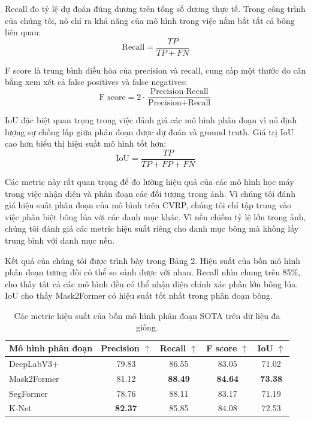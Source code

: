 \documentclass[12pt, a4paper]{article}
\begin{document}
Recall đo tỷ lệ dự đoán đúng dương trên tổng số dương thực tế. Trong công trình của chúng
tôi, nó chỉ ra khả năng của mô hình trong việc nắm bắt tất cả bông liên quan:
\begin{equation}
  \text{Recall} = \frac{TP}{TP + FN}
\end{equation}

F score là trung bình điều hòa của precision và recall, cung cấp một thước đo cân bằng xem
xét cả false positives và false negatives:
\begin{equation}
  \text{F score} = 2 \cdot \frac{\text{Precision} \cdot \text{Recall}}{\text{Precision} + \text{Recall}}
\end{equation}

IoU đặc biệt quan trọng trong việc đánh giá các mô hình phân đoạn vì nó định lượng sự chồng
lấp giữa phân đoạn được dự đoán và ground truth. Giá trị IoU cao hơn biểu thị hiệu suất mô
hình tốt hơn:
\begin{equation}
  \text{IoU} = \frac{TP}{TP + FP + FN}
\end{equation}

Các metric này rất quan trọng để đo lường hiệu quả của các mô hình học máy trong việc nhận
diện và phân đoạn các đối tượng trong ảnh. Vì chúng tôi đánh giá hiệu suất phân đoạn của mô
hình trên CVRP, chúng tôi chỉ tập trung vào việc phân biệt bông lúa với các danh mục khác.
Vì nền chiếm tỷ lệ lớn trong ảnh, chúng tôi đánh giá các metric hiệu suất riêng cho danh mục
bông mà không lấy trung bình với danh mục nền.

Kết quả của chúng tôi được trình bày trong Bảng 2. Hiệu suất của bốn mô hình phân đoạn tương
đối có thể so sánh được với nhau. Recall nhìn chung trên 85\%, cho thấy tất cả các mô hình
đều có thể nhận diện chính xác phần lớn bông lúa. IoU cho thấy Mask2Former có hiệu suất tốt
nhất trong phân đoạn bông.

\begin{table}[ht]
  \centering
  \caption{Các metric hiệu suất của bốn mô hình phân đoạn SOTA trên dữ liệu đa giống.}
  \label{tab:seg_results}
  \begin{tabular}{lcccc}
    \toprule
    \textbf{Mô hình phân đoạn} & \textbf{Precision $\uparrow$} & \textbf{Recall $\uparrow$} & \textbf{F score $\uparrow$} & \textbf{IoU $\uparrow$} \\
    \midrule
    DeepLabV3+ & 79.83 & 86.55 & 83.05 & 71.02 \\
    Mask2Former & 81.12 & \textbf{88.49} & \textbf{84.64} & \textbf{73.38} \\
    SegFormer   & 78.76 & 88.11 & 83.17 & 71.19 \\
    K-Net       & \textbf{82.37} & 85.85 & 84.08 & 72.53 \\
    \bottomrule
  \end{tabular}
\end{table}
\end{document}
